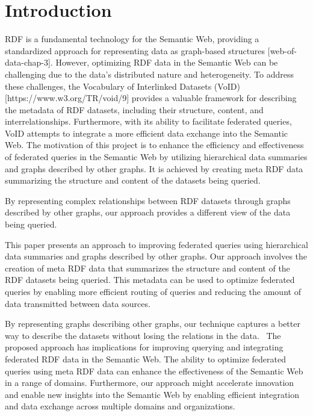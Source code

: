 \section{Introduction} \label{sec:introduction}
RDF is a fundamental technology for the Semantic Web, providing a standardized approach for representing data as graph-based structures [web-of-data-chap-3]. However, optimizing RDF data in the Semantic Web can be challenging due to the data's distributed nature and heterogeneity. To address these challenges, the Vocabulary of Interlinked Datasets (VoID) [https://www.w3.org/TR/void/9] provides a valuable framework for describing the metadata of RDF datasets, including their structure, content, and interrelationships. Furthermore, with its ability to facilitate federated queries, VoID attempts to integrate a more efficient data exchange into the Semantic Web. The motivation of this project is to enhance the efficiency and effectiveness of federated queries in the Semantic Web by utilizing hierarchical data summaries and graphs described by other graphs. It is achieved by creating meta RDF data summarizing the structure and content of the datasets being queried. 

By representing complex relationships between RDF datasets through graphs described by other graphs, our approach provides a different view of the data being queried.

This paper presents an approach to improving federated queries using hierarchical data summaries and graphs described by other graphs. Our approach involves the creation of meta RDF data that summarizes the structure and content of the RDF datasets being queried. This metadata can be used to optimize federated queries by enabling more efficient routing of queries and reducing the amount of data transmitted between data sources. 

By representing graphs describing other graphs, our technique captures a better way to describe the datasets without losing the relations in the data. 
The proposed approach has implications for improving querying and integrating federated RDF data in the Semantic Web. The ability to optimize federated queries using meta RDF data can enhance the effectiveness of the Semantic Web in a range of domains. Furthermore, our approach might accelerate innovation and enable new insights into the Semantic Web by enabling efficient integration and data exchange across multiple domains and organizations.